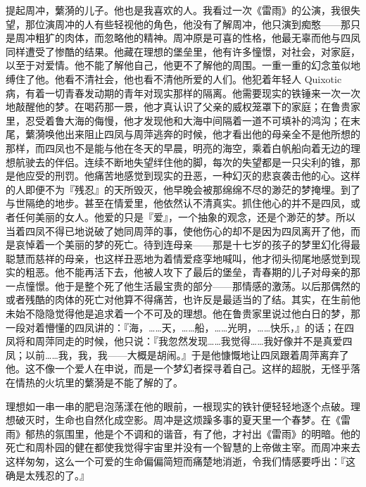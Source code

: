 提起周冲，蘩漪的儿子。他也是我喜欢的人。我看过一次《雷雨》的公演，我很失望，那位演周冲的人有些轻视他的角色，他没有了解周冲，他只演到痴憨——那只是周冲粗犷的肉体，而忽略他的精神。周冲原是可喜的性格，他最无辜而他与四凤同样遭受了惨酷的结果。他藏在理想的堡垒里，他有许多憧憬，对社会，对家庭，以至于对爱情。他不能了解他自己，他更不了解他的周围。一重一重的幻念茧似地缚住了他。他看不清社会，他也看不清他所爱的人们。他犯着年轻人 Quixotic 病，有着一切青春发动期的青年对现实那样的隔离。他需要现实的铁锤来一次一次地敲醒他的梦。在喝药那一景，他才真认识了父亲的威权笼罩下的家庭；在鲁贵家里，忍受着鲁大海的侮慢，他才发现他和大海中间隔着一道不可填补的鸿沟；在末尾，蘩漪唤他出来阻止四凤与周萍逃奔的时候，他才看出他的母亲全不是他所想的那样，而四凤也不是能与他在冬天的早晨，明亮的海空，乘着白帆船向着无边的理想航驶去的伴侣。连续不断地失望绊住他的脚，每次的失望都是一只尖利的锥，那是他应受的刑罚。他痛苦地感觉到现实的丑恶，一种幻灭的悲哀袭击他的心。这样的人即便不为『残忍』的天所毁灭，他早晚会被那绵绵不尽的渺茫的梦掩埋。到了与世隔绝的地步。甚至在情爱里，他依然认不清真实。抓住他心的并不是四凤，或者任何美丽的女人。他爱的只是『爱』，一个抽象的观念，还是个渺茫的梦。所以当着四凤不得已地说破了她同周萍的事，使他伤心的却不是因为四凤离开了他，而是哀悼着一个美丽的梦的死亡。待到连母亲——那是十七岁的孩子的梦里幻化得最聪慧而慈祥的母亲，也这样丑恶地为着情爱痉孪地喊叫，他才彻头彻尾地感觉到现实的粗恶。他不能再活下去，他被人攻下了最后的堡垒，青春期的儿子对母亲的那一点憧憬。他于是整个死了他生活最宝贵的部分——那情感的激荡。以后那偶然的或者残酷的肉体的死亡对他算不得痛苦，也许反是最适当的了结。其实，在生前他未始不隐隐觉得他是追求着一个不可及的理想。他在鲁贵家里说过他白日的梦，那一段对着懵懂的四凤讲的：『海，……天，……船，……光明，……快乐，』的话；在四凤将和周萍同走的时候，他只说：『我忽然发现……我觉得……我好像并不是真爱四凤；以前……我，我，我——大概是胡闹。』于是他慷慨地让四凤跟着周萍离弃了他。这不像一个爱人在申说，而是一个梦幻者探寻着自己。这样的超脱，无怪乎落在情热的火坑里的蘩漪是不能了解的了。

理想如一串一串的肥皂泡荡漾在他的眼前，一根现实的铁针便轻轻地逐个点破。理想破灭时，生命也自然化成空影。周冲是这烦躁多事的夏天里一个春梦。在《雷雨》郁热的氛围里，他是个不调和的谐音，有了他，才衬出《雷雨》的明暗。他的死亡和周朴园的健在都使我觉得宇宙里并没有一个智慧的上帝做主宰。而周冲来去这样匆匆，这么一个可爱的生命偏偏简短而痛楚地消逝，令我们情感要呼出：『这确是太残忍的了。』

